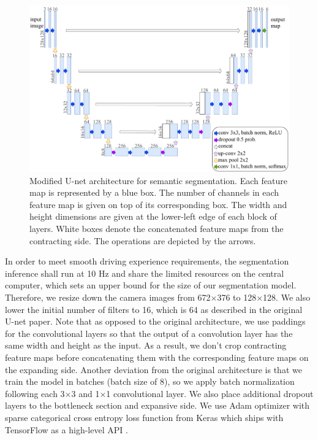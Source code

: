 \begin{figure}[h]
  \centering
  \includegraphics[width=1.0\textwidth]{figures/unet-architecture.pdf}
  \caption[Modified U-net semantic segmentation architecture]{Modified U-net
    architecture for semantic segmentation. Each feature map is represented by
    a blue box. The number of channels in each feature map is given on top of
    its corresponding box. The width and height dimensions are given at the
    lower-left edge of each block of layers. White boxes denote the
    concatenated feature maps from the contracting side. The operations are
    depicted by the arrows.
    }
  \label{figure:unet-architecture}
\end{figure}

In order to meet smooth driving experience requirements, the segmentation
inference shall run at 10 Hz and share the limited resources on the central
computer, which sets an upper bound for the size of our segmentation model.
Therefore, we resize down the camera images from 672$\times$376 to
128$\times$128. We also lower the initial number of filters to 16, which is 64
as described in the original U-net paper. Note that as opposed to the original
architecture, we use paddings for the convolutional layers so that the output
of a convolution layer has the same width and height as the input. As a result,
we don't crop contracting feature maps before concatenating them with the
corresponding feature maps on the expanding side. Another deviation from the
original architecture is that we train the model in batches (batch size of 8),
so we apply batch normalization following each 3$\times$3 and 1$\times$1
convolutional layer. We also place additional dropout layers to the bottleneck
section and expansive side. We use Adam optimizer with sparse categorical cross
entropy loss function from Keras which ships with TensorFlow as a high-level
API \cite{Abadi2015TF, Chollet2015Keras}.

